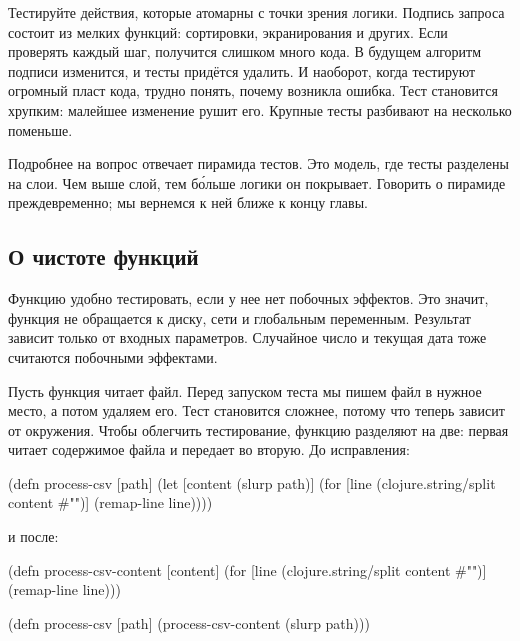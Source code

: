 Тестируйте действия, которые атомарны с точки зрения логики. Подпись запроса
состоит из мелких функций: сортировки, экранирования и других. Если проверять
каждый шаг, получится слишком много кода. В будущем алгоритм подписи изменится,
и тесты прид\"{е}тся удалить. И наоборот, когда тестируют огромный пласт кода,
трудно понять, почему возникла ошибка. Тест становится хрупким: малейшее
изменение рушит его. Крупные тесты разбивают на несколько поменьше.

Подробнее на вопрос отвечает пирамида тестов.
Это модель, где тесты разделены на слои. Чем выше слой, тем б\'{о}льше логики он
покрывает. Говорить о пирамиде преждевременно; мы вернемся к ней ближе к концу
главы.

\subsection{О чистоте функций}

Функцию удобно тестировать, если у нее нет побочных эффектов. Это значит,
функция не обращается к диску, сети и глобальным переменным. Результат зависит
только от входных параметров. Случайное число и текущая дата тоже считаются
побочными эффектами.

Пусть функция читает файл. Перед запуском теста мы пишем файл в нужное место, а
потом удаляем его. Тест становится сложнее, потому что теперь зависит от
окружения. Чтобы облегчить тестирование, функцию разделяют на две: первая читает
содержимое файла и передает во вторую. До исправления:

\begin{english}
  \begin{clojure}
(defn process-csv [path]
  (let [content (slurp path)]
    (for [line (clojure.string/split content #"\n")]
      (remap-line line))))
  \end{clojure}
\end{english}

\noindent
и после:

\begin{english}
  \begin{clojure}
(defn process-csv-content [content]
  (for [line (clojure.string/split content #"\n")]
    (remap-line line)))

(defn process-csv [path]
  (process-csv-content (slurp path)))
  \end{clojure}
\end{english}

